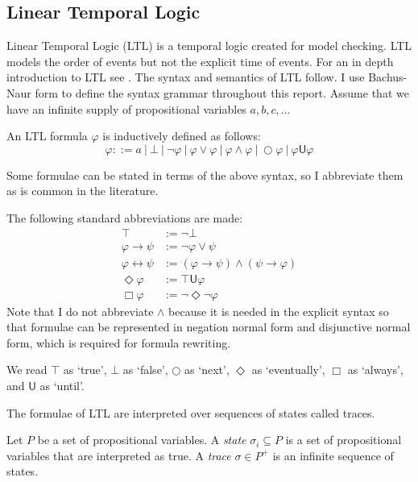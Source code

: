 \documentclass[a4paper]{article}
\newcommand{\U}{\mathsf{U}}
\begin{document}
\subsection{Linear Temporal Logic}
Linear Temporal Logic (LTL)\autocite{pnueli1977temporal} is a temporal logic created for model checking. LTL models the order of events but not the explicit time of events. For an in depth introduction to LTL see \textcite[Chapter 5]{baier2008principles}. The syntax and semantics of LTL follow. I use Bachus-Naur form to define the syntax grammar throughout this report. Assume that we have an infinite supply of propositional variables $a,b,c,\dots$
\begin{defn}\label{ltlsyn}

  An LTL formula $\varphi$ is inductively defined as follows:
  \[\varphi ::= a ~|~ \bot ~|~ \neg \varphi ~|~\varphi \lor \varphi ~|~ \varphi \land \varphi ~|~ \bigcirc \varphi ~|~ \varphi \U\varphi\]
\end{defn}

Some formulae can be stated in terms of the above syntax, so I abbreviate them as is common in the literature.

\begin{notn}\label{ltlabbrev}
  The following standard abbreviations are made:
  \begin{align*}
    \top &:= \neg \bot\\
    \varphi \to \psi &:= \neg \varphi \lor \psi\\
    \varphi \leftrightarrow \psi &:= (\varphi \to \psi) \land (\psi \to \varphi)\\
    \Diamond \varphi &:= \top \U{} \varphi\\
    \Box \varphi &:= \neg\Diamond\neg\varphi
  \end{align*}
  Note that I do not abbreviate $\land$ because it is needed in the explicit syntax so that formulae can be represented in negation normal form and disjunctive normal form, which is required for formula rewriting.
\end{notn}

We read $\top$ as `true', $\bot$ as `false', $\bigcirc$ as `next', $\Diamond$ as `eventually', $\Box$ as `always', and $\U$ as `until'.

The formulae of LTL are interpreted over sequences of states called traces.

\begin{defn}
  Let $P$ be a set of propositional variables. A \emph{state} $\sigma_i \subseteq P$ is a set of propositional variables that are interpreted as true. A \emph{trace} $\sigma \in P^+$ is an infinite sequence of states.
\end{defn}
\end{document}
